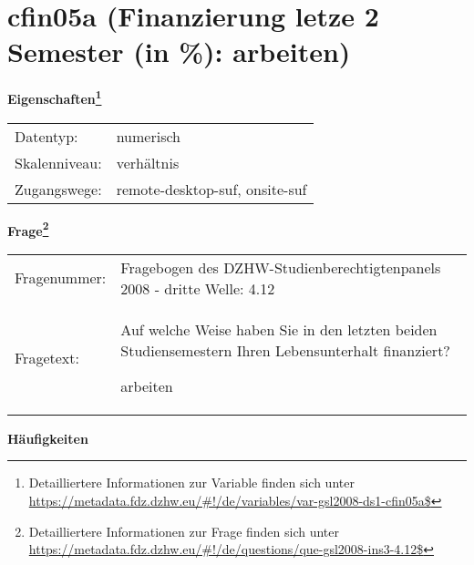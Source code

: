 
    \setcounter{footnote}{0}

    \vspace*{-1.8cm}
	\section{cfin05a (Finanzierung letze 2 Semester (in \%): arbeiten)}
	\label{section:cfin05a}



    \vspace*{0.5cm}
    \noindent\textbf{Eigenschaften\footnote{Detailliertere Informationen zur Variable finden sich unter
		\url{https://metadata.fdz.dzhw.eu/\#!/de/variables/var-gsl2008-ds1-cfin05a$}}}\\
	\begin{tabularx}{\hsize}{@{}lX}
	Datentyp: & numerisch \\
	Skalenniveau: & verhältnis \\
	Zugangswege: &
	  remote-desktop-suf, 
	  onsite-suf
 \\
    \end{tabularx}



				\vspace*{0.5cm}
                \noindent\textbf{Frage\footnote{Detailliertere Informationen zur Frage finden sich unter
		              \url{https://metadata.fdz.dzhw.eu/\#!/de/questions/que-gsl2008-ins3-4.12$}}}\\
				\begin{tabularx}{\hsize}{@{}lX}
					Fragenummer: &
					  Fragebogen des DZHW-Studienberechtigtenpanels 2008 - dritte Welle:
					  4.12
 \\
					Fragetext: & Auf welche Weise haben Sie in den letzten beiden Studiensemestern Ihren Lebensunterhalt finanziert?\par  arbeiten \\
				\end{tabularx}





        		\vspace*{0.5cm}
                \noindent\textbf{Häufigkeiten}

